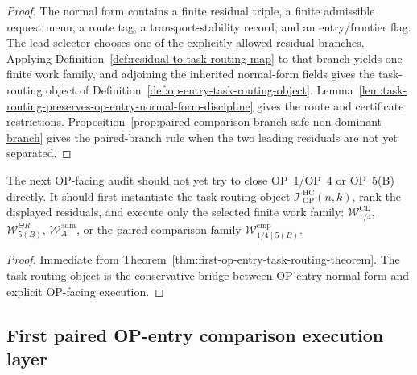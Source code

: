 \begin{proof}
The normal form contains a finite residual triple, a finite admissible request menu, a route tag, a transport-stability record, and an entry/frontier flag. The lead selector chooses one of the explicitly allowed residual branches. Applying Definition~\ref{def:residual-to-task-routing-map} to that branch yields one finite work family, and adjoining the inherited normal-form fields gives the task-routing object of Definition~\ref{def:op-entry-task-routing-object}. Lemma~\ref{lem:task-routing-preserves-op-entry-normal-form-discipline} gives the route and certificate restrictions. Proposition~\ref{prop:paired-comparison-branch-safe-non-dominant-branch} gives the paired-branch rule when the two leading residuals are not yet separated.
\end{proof}

\begin{corollary}
\label{cor:v3340-r03-working-rule}
The next OP-facing audit should not yet try to close OP~1/OP~4 or OP~5(B) directly. It should first instantiate the task-routing object $\mathcal T_{\mathrm{OP}}^{\mathrm{HC}}(n,k)$, rank the displayed residuals, and execute only the selected finite work family: $\mathcal W_{1/4}^{\mathrm{CL}}$, $\mathcal W_{5(B)}^{\Theta R}$, $\mathcal W_A^{\mathrm{adm}}$, or the paired comparison family $\mathcal W_{1/4\mid 5(B)}^{\mathrm{cmp}}$.
\end{corollary}

\begin{proof}
Immediate from Theorem~\ref{thm:first-op-entry-task-routing-theorem}. The task-routing object is the conservative bridge between OP-entry normal form and explicit OP-facing execution.
\end{proof}


\subsection{First paired OP-entry comparison execution layer}
\label{subsec:first-paired-op-entry-comparison-execution-layer}

